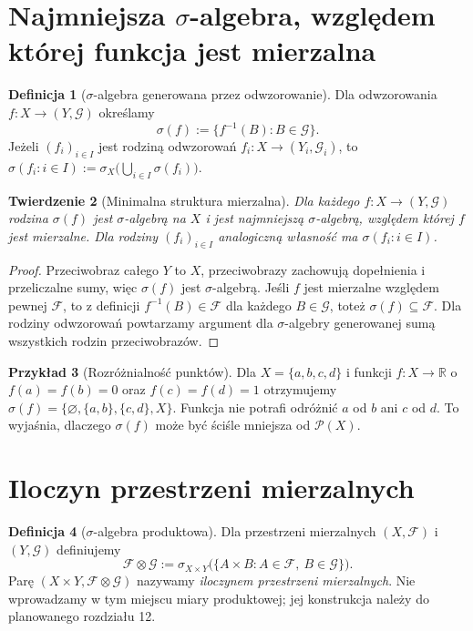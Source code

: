 \documentclass[11pt,a4paper,oneside]{book}
\numberwithin{equation}{chapter}
\theoremstyle{plain}
\newtheorem{twierdzenie}{Twierdzenie}[chapter]
\theoremstyle{definition}
\newtheorem{definicja}[twierdzenie]{Definicja}
\newtheorem{przyklad}[twierdzenie]{Przykład}
\theoremstyle{remark}
\begin{document}
\section{Najmniejsza \texorpdfstring{$\sigma$}{sigma}-algebra, względem której funkcja jest mierzalna}

\begin{definicja}[$\sigma$-algebra generowana przez odwzorowanie]
\label{def:sigma-of-function}
Dla odwzorowania $f:X\to(Y,\mathcal G)$ określamy
\[
\sigma(f):=\{f^{-1}(B):B\in\mathcal G\}.
\]
Jeżeli $(f_i)_{i\in I}$ jest rodziną odwzorowań
$f_i:X\to(Y_i,\mathcal G_i)$, to
$\sigma(f_i:i\in I):=\sigma_X\bigl(\bigcup_{i\in I}\sigma(f_i)\bigr)$.
\end{definicja}

\begin{twierdzenie}[Minimalna struktura mierzalna]
\label{thm:initial-sigma}
Dla każdego $f:X\to(Y,\mathcal G)$ rodzina $\sigma(f)$
jest $\sigma$-algebrą na $X$ i jest najmniejszą
$\sigma$-algebrą, względem której $f$ jest mierzalne.
Dla rodziny $(f_i)_{i\in I}$ analogiczną własność
ma $\sigma(f_i:i\in I)$.
\end{twierdzenie}
\begin{proof}
Przeciwobraz całego $Y$ to $X$, przeciwobrazy zachowują
dopełnienia i przeliczalne sumy, więc $\sigma(f)$
jest $\sigma$-algebrą. Jeśli $f$ jest mierzalne
względem pewnej $\mathcal F$, to z definicji
$f^{-1}(B)\in\mathcal F$ dla każdego $B\in\mathcal G$,
toteż $\sigma(f)\subseteq\mathcal F$.
Dla rodziny odwzorowań powtarzamy argument dla
$\sigma$-algebry generowanej sumą wszystkich
rodzin przeciwobrazów.
\end{proof}

\begin{przyklad}[Rozróżnialność punktów]
Dla $X=\{a,b,c,d\}$ i funkcji $f:X\to\mathbb R$ o
$f(a)=f(b)=0$ oraz $f(c)=f(d)=1$ otrzymujemy
$\sigma(f)=\{\varnothing,\{a,b\},\{c,d\},X\}$.
Funkcja nie potrafi odróżnić $a$ od $b$ ani $c$ od $d$.
To wyjaśnia, dlaczego $\sigma(f)$ może być ściśle mniejsza
od $\mathcal P(X)$.
\end{przyklad}

\section{Iloczyn przestrzeni mierzalnych}

\begin{definicja}[$\sigma$-algebra produktowa]
\label{def:product-sigma}
Dla przestrzeni mierzalnych $(X,\mathcal F)$ i
$(Y,\mathcal G)$ definiujemy
\[
\mathcal F\otimes\mathcal G
:=\sigma_{X\times Y}\bigl(\{A\times B:A\in\mathcal F,\ B\in\mathcal G\}\bigr).
\]
Parę $(X\times Y,\mathcal F\otimes\mathcal G)$
nazywamy \emph{iloczynem przestrzeni mierzalnych}.
Nie wprowadzamy w tym miejscu miary produktowej;
jej konstrukcja należy do planowanego rozdziału 12.
\end{definicja}
\end{document}
